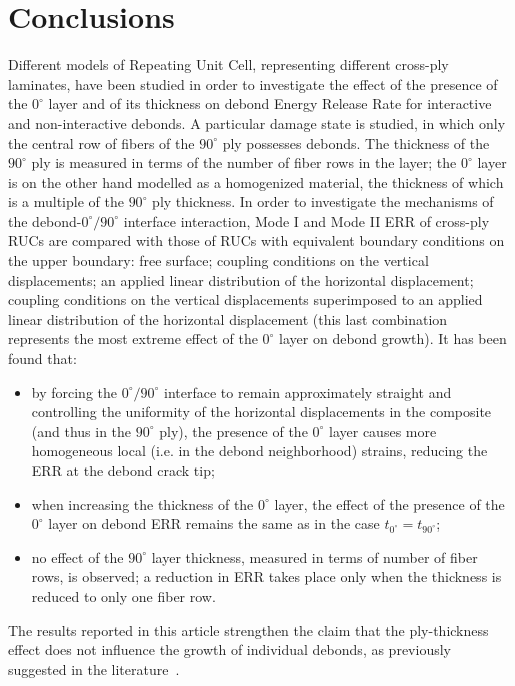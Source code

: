 
\section{Conclusions}

Different models of Repeating Unit Cell, representing different cross-ply laminates, have been studied in order to investigate the effect of the presence of the $0^{\circ}$ layer and of its thickness on debond Energy Release Rate for interactive and non-interactive debonds. A particular damage state is studied, in which only the central row of fibers of the $90^{\circ}$ ply possesses debonds. The thickness of the $90^{\circ}$ ply is measured in terms of the number of fiber rows in the layer; the $0^{\circ}$ layer is on the other hand modelled as a homogenized material, the thickness of which is a multiple of the $90^{\circ}$ ply thickness. In order to investigate the mechanisms of the debond-$0^{\circ}/90^{\circ}$ interface interaction, Mode I and Mode II ERR of cross-ply RUCs are compared with those of RUCs with equivalent boundary conditions on the upper boundary: free surface; coupling conditions on the vertical displacements; an applied linear distribution of the horizontal displacement; coupling conditions on the vertical displacements superimposed to an applied linear distribution of the horizontal displacement (this last combination represents the most extreme effect of the $0^{\circ}$ layer on debond growth). It has been found that:
\begin{itemize}
\item by forcing the $0^{\circ}/90^{\circ}$ interface to remain approximately straight and controlling the uniformity of the horizontal displacements in the composite (and thus in the $90^{\circ}$ ply), the presence of the $0^{\circ}$ layer causes more homogeneous local (i.e. in the debond neighborhood) strains, reducing the ERR at the debond crack tip;
\item when increasing the thickness of the $0^{\circ}$ layer, the effect of the presence of the $0^{\circ}$ layer on debond ERR remains the same as in the case $t_{0^{\circ}}=t_{90^{\circ}}$;
\item no effect of the $90^{\circ}$ layer thickness, measured in terms of number of fiber rows, is observed; a reduction in ERR takes place only when the thickness is reduced to only one fiber row.
\end{itemize}
The results reported in this article strengthen the claim that the ply-thickness effect does not influence the growth of individual debonds, as previously suggested in the literature~\cite{Saito2012,Herraez2015,Velasco2018, Paris2018}.


